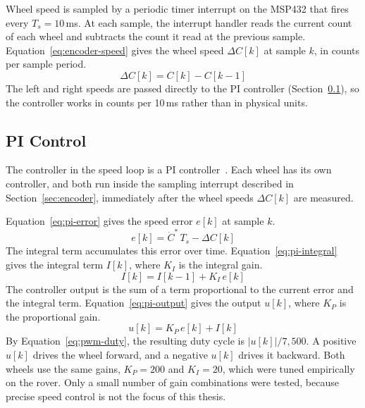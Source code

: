 Wheel speed is sampled by a periodic timer interrupt on the MSP432 that fires every
$T_s = 10$\,ms. At each sample, the interrupt handler reads the current count of each wheel
and subtracts the count it read at the previous sample. Equation~\ref{eq:encoder-speed} gives
the wheel speed $\Delta C[k]$ at sample $k$, in counts per sample period.
\begin{equation}
  \Delta C[k] = C[k] - C[k-1]
  \label{eq:encoder-speed}
\end{equation}
The left and right speeds are passed directly to the PI controller
(Section~\ref{sec:PI}), so the controller works in counts per 10\,ms rather than in
physical units.

\subsection{PI Control}
\label{sec:PI}

The controller in the speed loop is a PI controller~\cite{Alciatore_Mechatronics}. Each
wheel has its own controller, and both run inside the sampling interrupt described in
Section~\ref{sec:encoder}, immediately after the wheel speeds $\Delta C[k]$ are measured.

Equation~\ref{eq:pi-error} gives the speed error $e[k]$ at sample $k$.
\begin{equation}
  e[k] = \dot{C}^*\,T_s - \Delta C[k]
  \label{eq:pi-error}
\end{equation}
The integral term accumulates this error over time. Equation~\ref{eq:pi-integral} gives
the integral term $I[k]$, where $K_I$ is the integral gain.
\begin{equation}
  I[k] = I[k-1] + K_I\,e[k]
  \label{eq:pi-integral}
\end{equation}
The controller output is the sum of a term proportional to the current error and the
integral term. Equation~\ref{eq:pi-output} gives the output $u[k]$, where $K_P$ is the
proportional gain.
\begin{equation}
  u[k] = K_P\,e[k] + I[k]
  \label{eq:pi-output}
\end{equation}
By Equation~\ref{eq:pwm-duty}, the resulting duty cycle is $|u[k]|/7{,}500$. A positive
$u[k]$ drives the wheel forward, and a negative $u[k]$ drives it backward.
Both wheels use the same gains, $K_P = 200$ and $K_I = 20$, which were tuned empirically
on the rover. Only a small number of gain combinations were tested, because precise speed
control is not the focus of this thesis.

